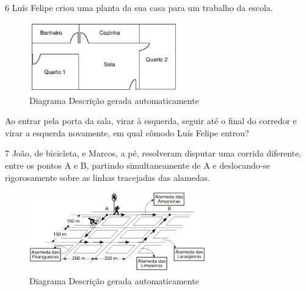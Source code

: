 \begin{escolha}
\begin{escolha}
\begin{escolha}
\begin{escolha}
{\begin{boxmedio}
\begin{boxpeq}
\begin{q°}
\begin{boxmedio}
\begin{boxpeq}
\begin{boxpeq}
\begin{boxmedio}
\begin{boxmedio}
\begin{boxmedio}
\num{6} Luís Felipe criou uma planta da sua casa para um trabalho da escola.

\begin{figure}
\centering
\includegraphics[width=2.52083in,height=1.18147in]{./_SAEB_9_MAT/media/image204.png}
\caption{Diagrama Descrição gerada automaticamente}
\end{figure}


Ao entrar pela porta da sala, virar à esquerda, seguir até o final do
corredor e virar a esquerda novamente, em qual cômodo Luís Felipe entrou?



\num{7} João, de bicicleta, e Marcos, a pé, resolveram disputar uma corrida diferente, 
entre os pontos A e B, partindo simultaneamente de A e deslocando-se
rigorosamente sobre as linhas tracejadas das alamedas.

\begin{figure}
\centering
\includegraphics[width=3.00694in,height=1.36847in]{./_SAEB_9_MAT/media/image206.png}
\caption{Diagrama Descrição gerada automaticamente}
\end{figure}


\end{boxmedio}
\end{boxmedio}
\end{boxmedio}
\end{boxpeq}
\end{boxpeq}
\end{boxmedio}
\end{q°}
\end{boxpeq}
\end{boxmedio}}
\end{escolha}
\end{escolha}
\end{escolha}
\end{escolha}
